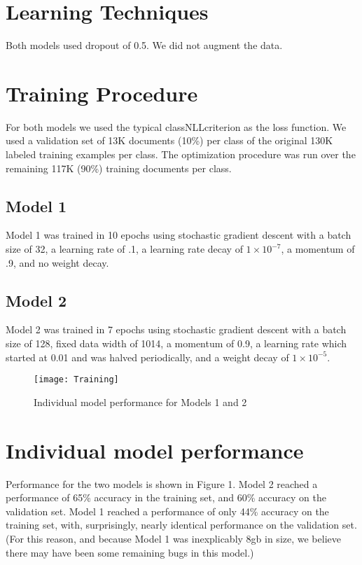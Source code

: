 \documentclass{article} %
\begin{document}
\section{Learning Techniques}

Both models used dropout of 0.5. We did not augment the data. 

\section{Training Procedure}

For both models we used the typical classNLLcriterion as the loss function. We used a validation set of 13K documents (10\%) per class of the original 130K labeled training examples per class.
The optimization procedure was run over the remaining 117K (90\%) training documents per class.


\subsection{Model 1}

Model 1 was trained in 10 epochs using stochastic gradient descent with a batch size of 32, a learning rate of .1, a learning rate decay of $1\times 10^{-7}$, a momentum of .9, and no weight decay.

\subsection{Model 2}

Model 2 was trained in 7 epochs using stochastic gradient descent with
a batch size of 128, fixed data width of 1014, a momentum of 0.9, a
learning rate which started at 0.01 and was halved periodically, and a
weight decay of $1\times 10^{-5}$.


\begin{figure}
	\texttt{[image: Training]}
        \label{fig1}
        \caption{Individual model performance for Models 1 and 2}
\end{figure}

\section{Individual model performance}
Performance for the two models is shown in Figure 1.   Model 2 reached a performance of 65\% accuracy in the training set,
and 60\% accuracy on the validation set. Model 1 reached a performance
of only 44\% accuracy on the training set, with, surprisingly, nearly
identical performance on the validation set. (For this reason, and
because Model 1 was inexplicably 8gb in size, we believe there may
have been some remaining bugs in this model.)
\end{document}
